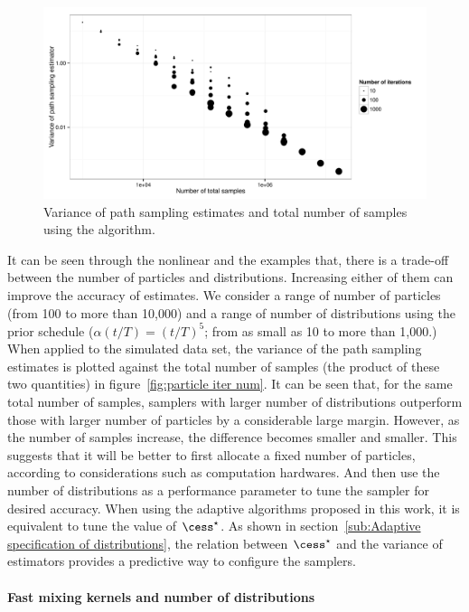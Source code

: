 \begin{figure}[t]
  \includegraphics[width=\linewidth]{fig/Particle_Iter_Var}
  \caption{Variance of path sampling estimates and total number of samples
    using the \smc[2] algorithm.}
  \label{fig:particle iter num}
\end{figure}

It can be seen through the nonlinear \ode and the \pet examples that, there is
a trade-off between the number of particles and distributions. Increasing
either of them can improve the accuracy of estimates. We consider a range of
number of particles (from 100 to more than 10,000) and a range of number of
distributions using the prior schedule ($\alpha(t/T) = (t/T)^5$; from as small
as 10 to more than 1,000.) When applied to the simulated data set, the
variance of the path sampling estimates is plotted against the total number of
samples (the product of these two quantities) in figure~\ref{fig:particle iter
  num}. It can be seen that, for the same total number of samples, samplers
with larger number of distributions outperform those with larger number of
particles by a considerable large margin. However, as the number of samples
increase, the difference becomes smaller and smaller. This suggests that it
will be better to first allocate a fixed number of particles, according to
considerations such as computation hardwares. And then use the number of
distributions as a performance parameter to tune the sampler for desired
accuracy. When using the adaptive algorithms proposed in this work, it is
equivalent to tune the value of $\cess^\star$. As shown in
section~\ref{sub:Adaptive specification of distributions}, the relation
between $\cess^\star$ and the variance of estimators provides a predictive way
to configure the samplers.

\paragraph{Fast mixing \mcmc kernels and number of distributions}

